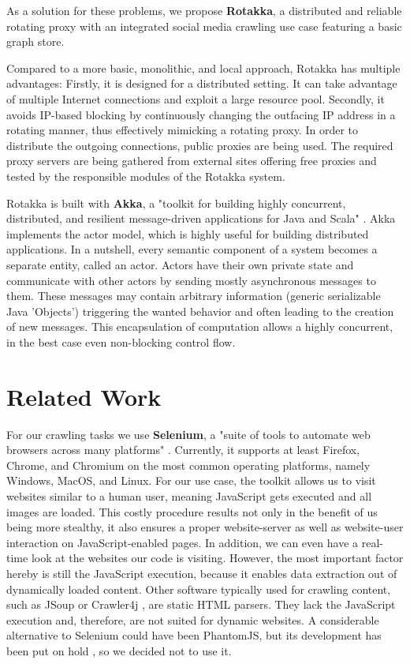 \documentclass{sigchi}
\begin{document}
As a solution for these problems, we propose \textbf{Rotakka}, a distributed and reliable rotating proxy with an integrated social media crawling use case featuring a basic graph store.

Compared to a more basic, monolithic, and local approach, Rotakka has multiple advantages: Firstly, it is designed for a distributed setting. It can take advantage of multiple Internet connections and exploit a large resource pool. Secondly, it avoids IP-based blocking by continuously changing the outfacing IP address in a rotating manner, thus effectively mimicking a rotating proxy. In order to distribute the outgoing connections, public proxies are being used. The required proxy servers are being gathered from external sites offering free proxies and tested by the responsible modules of the Rotakka system.

Rotakka is built with \textbf{Akka}, a "toolkit for building highly concurrent, distributed, and resilient message-driven applications for Java and Scala" \cite{akka:homepage}. Akka implements the actor model, which is highly useful for building distributed applications. In a nutshell, every semantic component of a system becomes a separate entity, called an actor. Actors have their own private state and communicate with other actors by sending mostly asynchronous messages to them. These messages may contain arbitrary information (generic serializable Java 'Objects') triggering the wanted behavior and often leading to the creation of new messages. This encapsulation of computation allows a highly concurrent, in the best case even non-blocking control flow.

\section{Related Work}
\label{sec:related_work}

For our crawling tasks we use \textbf{Selenium}, a "suite of tools to automate web browsers across many platforms" \cite{selenium:homepage}. Currently, it supports at least Firefox, Chrome, and Chromium on the most common operating platforms, namely Windows, MacOS, and Linux. For our use case, the toolkit allows us to visit websites similar to a human user, meaning JavaScript gets executed and all images are loaded. This costly procedure results not only in the benefit of us being more stealthy, it also ensures a proper website-server as well as website-user interaction on JavaScript-enabled pages. In addition, we can even have a real-time look at the websites our code is visiting. However, the most important factor hereby is still the JavaScript execution, because it enables data extraction out of dynamically loaded content. Other software typically used for crawling content, such as JSoup \cite{jsoup:homepage} or Crawler4j \cite{crawler4j:github}, are static HTML parsers. They lack the JavaScript execution and, therefore, are not suited for dynamic websites. A considerable alternative to Selenium could have been PhantomJS, but its development has been put on hold \cite{phantomjs:homepage}, so we decided not to use it.
\end{document}
